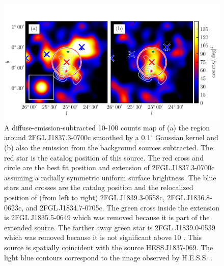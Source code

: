 \documentclass[12pt,preprint]{aastex}
\newcommand{\gev}{\text{GeV}\xspace}
\newcommand{\tev}{\text{TeV}\xspace}
\renewcommand{\deg}{\ensuremath{^\circ}\xspace}
\begin{document}
\begin{figure}
  \begin{center}
    \includegraphics[type=pdf,ext=.pdf,read=.pdf]{source_plots/source_1FGL_J1837.5-0659c}
  \end{center}
  \caption{
  A diffuse-emission-subtracted 10-100 \gev counts map of
  (a)
  the region around 2FGL\,J1837.3-0700c smoothed by a 0.1\deg Gaussian
  kernel and (b) also the emission from the background 
  sources subtracted.  The red
  star is the catalog position of this source. The red cross and circle
  are the best fit position and extension  of 2FGL\,J1837.3-0700c 
  assuming a radially
  symmetric uniform surface brightness. The blue stars and crosses are the
  catalog position and the relocalized position of (from left to right)
  2FGL\,J1839.3-0558c, 2FGL\,J1836.8-0623c, and 2FGL\,J1834.7-0705c.
  The green cross inside the extension is 2FGL\,J1835.5-0649 which
  was removed because it is part of the extended source.  The farther
  away green star is 2FGL J1839.0-0539 which was removed because
  it is not significant above 10 \gev.  This source is spatially
  coincident with the \tev source HESS\,J1837-069.  The light blue
  contours correspond to the \tev image observed by H.E.S.S.
  \citep{hess_plane_survey}.}\label{1FGL_J1837.5-0659c}
\end{figure}
\end{document}
